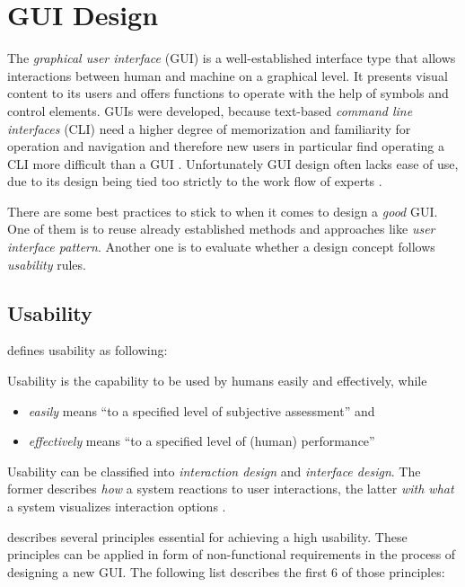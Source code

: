 \documentclass[twoside, openright, 12pt]{book}
\begin{document}
\section{GUI Design}
\label{gui_design}
The \textit{graphical user interface} (GUI) is a well-established interface type that allows interactions between human and machine on a graphical level.
It presents visual content to its users and offers functions to operate with the help of symbols and control elements.
GUIs were developed, because text-based \textit{command line interfaces} (CLI) need a higher degree of memorization and familiarity for operation and navigation and therefore new users in particular find operating a CLI more difficult than a GUI \citep{CLI}.
Unfortunately GUI design often lacks ease of use, due to its design being tied too strictly to the work flow of experts \citep{Reckling14}.

There are some best practices to stick to when it comes to design a \textit{good} GUI.
One of them is to reuse already established methods and approaches like \textit{user interface pattern}.
Another one is to evaluate whether a design concept follows \textit{usability} rules.



\subsection{Usability}
\label{usability}
\cite{Shackel91a} defines usability as following:

\begin{xdefinition}[Usability] 
Usability is the capability to be used by humans easily and effectively, while
\begin{itemize}
\item \textit{easily} means ``to a specified level of subjective assessment'' and
\item \textit{effectively} means ``to a specified level of (human) performance''
\end{itemize}
\label{definition:usability}
\end{xdefinition}

\noindent
Usability can be classified into \textit{interaction design} and \textit{interface design}.
The former describes \textit{how} a system reactions to user interactions, the latter \textit{with what} a system visualizes interaction options \citep{Reckling14}.

\cite{Tidwell11} describes several principles essential for achieving a high usability.
These principles can be applied in form of non-functional requirements in the process of designing a new GUI.
The following list describes the first 6 of those principles:
\end{document}
